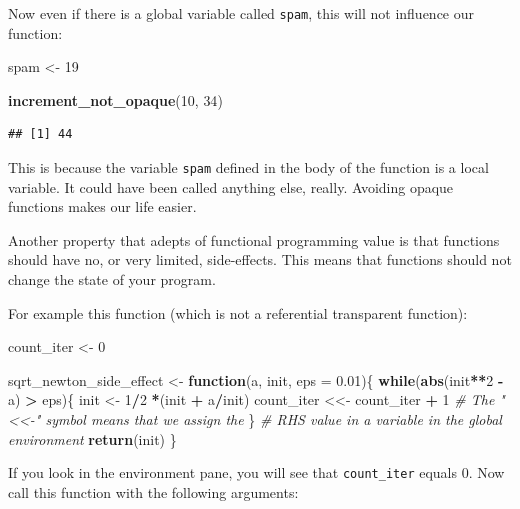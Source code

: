 \documentclass[]{gitbook}
\newenvironment{Shaded}{\begin{snugshade}}{\end{snugshade}}
\newcommand{\CommentTok}[1]{\textcolor[rgb]{0.56,0.35,0.01}{\textit{#1}}}
\newcommand{\ControlFlowTok}[1]{\textcolor[rgb]{0.13,0.29,0.53}{\textbf{#1}}}
\newcommand{\DataTypeTok}[1]{\textcolor[rgb]{0.13,0.29,0.53}{#1}}
\newcommand{\DecValTok}[1]{\textcolor[rgb]{0.00,0.00,0.81}{#1}}
\newcommand{\FloatTok}[1]{\textcolor[rgb]{0.00,0.00,0.81}{#1}}
\newcommand{\KeywordTok}[1]{\textcolor[rgb]{0.13,0.29,0.53}{\textbf{#1}}}
\newcommand{\NormalTok}[1]{#1}
\newcommand{\OperatorTok}[1]{\textcolor[rgb]{0.81,0.36,0.00}{\textbf{#1}}}
\newcommand{\StringTok}[1]{\textcolor[rgb]{0.31,0.60,0.02}{#1}}
\begin{document}
Now even if there is a global variable called \texttt{spam}, this will not influence our function:

\begin{Shaded}
\begin{Highlighting}[]
\NormalTok{spam <-}\StringTok{ }\DecValTok{19}

\KeywordTok{increment_not_opaque}\NormalTok{(}\DecValTok{10}\NormalTok{, }\DecValTok{34}\NormalTok{)}
\end{Highlighting}
\end{Shaded}

\begin{verbatim}
## [1] 44
\end{verbatim}

This is because the variable \texttt{spam} defined in the body of the function is a local variable. It
could have been called anything else, really. Avoiding opaque functions makes our life easier.

Another property that adepts of functional programming value is that functions should have no, or
very limited, side-effects. This means that functions should not change the state of your program.

For example this function (which is not a referential transparent function):

\begin{Shaded}
\begin{Highlighting}[]
\NormalTok{count_iter <-}\StringTok{ }\DecValTok{0}

\NormalTok{sqrt_newton_side_effect <-}\StringTok{ }\ControlFlowTok{function}\NormalTok{(a, init, }\DataTypeTok{eps =} \FloatTok{0.01}\NormalTok{)\{}
    \ControlFlowTok{while}\NormalTok{(}\KeywordTok{abs}\NormalTok{(init}\OperatorTok{**}\DecValTok{2} \OperatorTok{-}\StringTok{ }\NormalTok{a) }\OperatorTok{>}\StringTok{ }\NormalTok{eps)\{}
\NormalTok{        init <-}\StringTok{ }\DecValTok{1}\OperatorTok{/}\DecValTok{2} \OperatorTok{*}\NormalTok{(init }\OperatorTok{+}\StringTok{ }\NormalTok{a}\OperatorTok{/}\NormalTok{init)}
\NormalTok{        count_iter <<-}\StringTok{ }\NormalTok{count_iter }\OperatorTok{+}\StringTok{ }\DecValTok{1} \CommentTok{# The "<<-" symbol means that we assign the}
\NormalTok{    \}                                 }\CommentTok{# RHS value in a variable in the global environment}
    \KeywordTok{return}\NormalTok{(init)}
\NormalTok{\}}
\end{Highlighting}
\end{Shaded}

If you look in the environment pane, you will see that \texttt{count\_iter} equals 0. Now call this
function with the following arguments:
\end{document}
